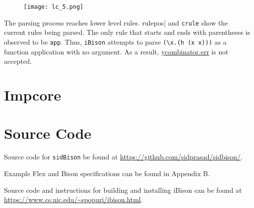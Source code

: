 \begin{figure}[H] \centering
\texttt{[image: lc\_5.png]}
\end{figure}

\noindent

The parsing process reaches lower level rules. \verb||rulepos| and \verb|crule| show the current rules being parsed. The only rule that starts and ends with parentheses is observed to be \verb|app|. Thus, \verb|iBison| attempts to parse \verb|(\x.(h (x x)))| as a function application with no argument. As a result, \href{https://github.com/sidprasad/sidbison/blob/master/lambdacalcexample/input/ycombinator.err} {ycombinator.err} is not accepted.



\section{Impcore}

\section{Source Code}

Source code for \verb|sidBison| be found at \url{https://github.com/sidprasad/sidbison/}. 

\noindent
Example Flex and Bison specifications can be found in Appendix B.

\noindent
 Source code and instructions for building and installing iBison can be found at \url{https://www.cs.uic.edu/~spopuri/ibison.html}.